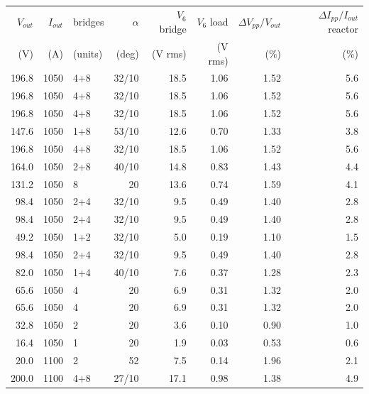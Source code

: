 \begin{tabular}{rrlrrrrr}
\toprule
$V_{out}$ & $I_{out}$ & bridges & $\alpha$ & $V_6$ bridge & $V_6$ load & $\Delta V_{pp}/V_{out}$ & $\Delta I_{pp}/I_{out}$ reactor\\
(V) & (A) & (units) & (deg) & (V rms) & (V rms) & (\%) & (\%)\\
\midrule
196.8 & 1050 & 4+8 & 32/10 & 18.5 & 1.06 & 1.52 & 5.6\\
196.8 & 1050 & 4+8 & 32/10 & 18.5 & 1.06 & 1.52 & 5.6\\
196.8 & 1050 & 4+8 & 32/10 & 18.5 & 1.06 & 1.52 & 5.6\\
147.6 & 1050 & 1+8 & 53/10 & 12.6 & 0.70 & 1.33 & 3.8\\
196.8 & 1050 & 4+8 & 32/10 & 18.5 & 1.06 & 1.52 & 5.6\\
164.0 & 1050 & 2+8 & 40/10 & 14.8 & 0.83 & 1.43 & 4.4\\
131.2 & 1050 & 8 & 20 & 13.6 & 0.74 & 1.59 & 4.1\\
98.4 & 1050 & 2+4 & 32/10 & 9.5 & 0.49 & 1.40 & 2.8\\
98.4 & 1050 & 2+4 & 32/10 & 9.5 & 0.49 & 1.40 & 2.8\\
49.2 & 1050 & 1+2 & 32/10 & 5.0 & 0.19 & 1.10 & 1.5\\
98.4 & 1050 & 2+4 & 32/10 & 9.5 & 0.49 & 1.40 & 2.8\\
82.0 & 1050 & 1+4 & 40/10 & 7.6 & 0.37 & 1.28 & 2.3\\
65.6 & 1050 & 4 & 20 & 6.9 & 0.31 & 1.32 & 2.0\\
65.6 & 1050 & 4 & 20 & 6.9 & 0.31 & 1.32 & 2.0\\
32.8 & 1050 & 2 & 20 & 3.6 & 0.10 & 0.90 & 1.0\\
16.4 & 1050 & 1 & 20 & 1.9 & 0.03 & 0.53 & 0.6\\
20.0 & 1100 & 2 & 52 & 7.5 & 0.14 & 1.96 & 2.1\\
200.0 & 1100 & 4+8 & 27/10 & 17.1 & 0.98 & 1.38 & 4.9\\
\bottomrule
\end{tabular}
